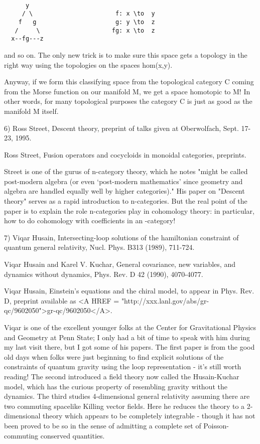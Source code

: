 \begin{verbatim}

      y
     / \                       f: x \to  y
    f   g                      g: y \to  z
   /     \                    fg: x \to  z
  x--fg---z

\end{verbatim}
    
and so on.  The only new trick is to make sure this space gets a
topology in the right way using the topologies on the spaces hom(x,y).  

Anyway, if we form this classifying space from the topological
category C coming from the Morse function on our manifold M, we get a
space homotopic to M!  In other words, for many topological purposes the
category C is just as good as the manifold M itself.

6) Ross Street, Descent theory, preprint of talks given at Oberwolfach,
Sept. 17-23, 1995.  

Ross Street, Fusion operators and cocycloids in monoidal categories, 
preprints.

Street is one of the gurus of n-category theory, which he notes "might
be called post-modern algebra (or even `post-modern mathematics' since
geometry and algebra are handled equally well by higher categories)."
His paper on "Descent theory" serves as a rapid introduction to
n-categories.  But the real point of the paper is to explain the role
n-categories play in cohomology theory: in particular, how to do
cohomology with coefficients in an \omega -category!

7) Viqar Husain, Intersecting-loop solutions of the hamiltonian constraint
of quantum general relativity, Nucl. Phys. B313 (1989), 711-724.

Viqar Husain and Karel V. Kuchar, General covariance, new variables,
and dynamics without dynamics, Phys. Rev. D 42 (1990), 4070-4077.

Viqar Husain, Einstein's equations and the chiral model, to appear in
Phys. Rev. D, preprint available as <A HREF = "http://xxx.lanl.gov/abs/gr-qc/9602050">gr-qc/9602050</A>.

Viqar is one of the excellent younger folks at the Center for
Gravitational Physics and Geometry at Penn State; I only had a bit of
time to speak with him during my last visit there, but I got some of his
papers.  The first paper is from the good old days when folks were just
beginning to find explicit solutions of the constraints of quantum
gravity using the loop representation - it's still worth reading!  The
second introduced a field theory now called the Husain-Kuchar model,
which has the curious property of resembling gravity without the
dynamics.  The third studies 4-dimensional general relativity assuming
there are two commuting spacelike Killing vector fields.  Here he
reduces the theory to a 2-dimensional theory which appears to be completely
integrable - though it has not been proved to be so in the sense of
admitting a complete set of Poisson-commuting conserved quantities.  

